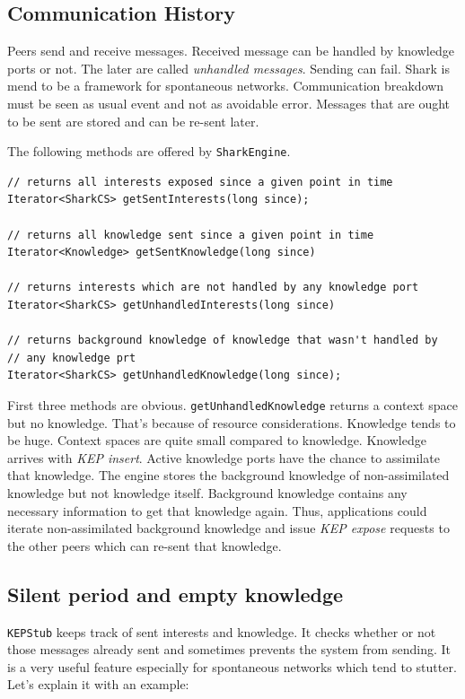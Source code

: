 \subsection{Communication History}
Peers send and receive messages. Received message can be handled by knowledge ports or not. The later are called {\it unhandled messages}. Sending can fail. Shark is mend to be a framework for spontaneous networks. Communication breakdown must be seen as usual event and not as avoidable error. Messages that are ought to be sent are stored and can be re-sent later.

The following methods are offered by {\tt SharkEngine}.

\begin{verbatim}
// returns all interests exposed since a given point in time
Iterator<SharkCS> getSentInterests(long since);

// returns all knowledge sent since a given point in time
Iterator<Knowledge> getSentKnowledge(long since)
  
// returns interests which are not handled by any knowledge port
Iterator<SharkCS> getUnhandledInterests(long since)

// returns background knowledge of knowledge that wasn't handled by
// any knowledge prt
Iterator<SharkCS> getUnhandledKnowledge(long since);
\end{verbatim}

First three methods are obvious. {\tt getUnhandledKnowledge} returns a context space but no knowledge. That's because of resource considerations. Knowledge tends to be huge. Context spaces are quite small compared to knowledge. Knowledge arrives with {\it KEP insert}. Active knowledge ports have the chance to assimilate that knowledge. The engine stores the background knowledge of non-assimilated knowledge but not knowledge itself. Background knowledge contains any necessary information to get that knowledge again. Thus, applications could iterate non-assimilated background knowledge and issue {\it KEP expose} requests to the other peers which can re-sent that knowledge.

\subsection{Silent period and empty knowledge}
{\tt KEPStub} keeps track of sent interests and knowledge. It checks whether 
or not those messages already sent and sometimes prevents the system from sending. 
It is a very useful feature especially for spontaneous networks which tend to stutter. Let's explain it with an example:


